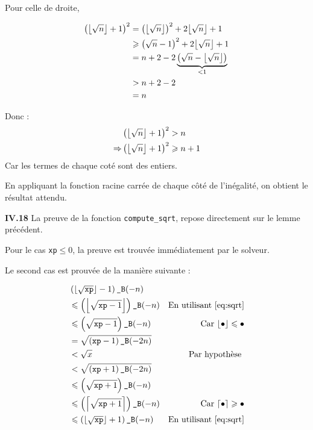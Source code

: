 \documentclass[9pt,a4paper,twocolumn]{article}
\theoremstyle{definition}
\DeclarePairedDelimiter\ceil{\lceil}{\rceil}
\DeclarePairedDelimiter\floor{\lfloor}{\rfloor}
\newcommand{\B}{\texttt{\_B}}
\renewcommand{\leq}{\leqslant}
\renewcommand{\geq}{\geqslant}
\newenvironment{code}[1][ocaml]{%
\newgeometry{textwidth = 0.8\textwidth}
\VerbatimEnvironment\begin{verbatim}%
}{%
\end{verbatim}
\restoregeometry
}
\begin{document}
Pour celle de droite,

\begin{align*}
   \left(\floor*{\sqrt{n}}+1 \right)^2
   &=\left(\floor*{\sqrt{n}}\right)^2 + 2\floor*{\sqrt{n}} +1
\\   &\geq \left(\sqrt{n} -1 \right)^2 + 2\floor*{\sqrt{n}} +1
\\   &= n + 2 -2
      \underbrace{\left(\sqrt{ n }- \floor*{\sqrt{ n }}\right)}_{< 1}
\\   &> n + 2 -2
\\   &= n
\end{align*}

Donc :
\begin{align*}
   &\left(\floor*{\sqrt{n}}+1 \right)^2 > n
\\   \Rightarrow
   &\left(\floor*{\sqrt{n}}+1 \right)^2 \geq n+1
\end{align*}
Car les termes de chaque coté sont des entiers.

En appliquant la fonction racine carrée de chaque côté de l'inégalité,
on obtient le résultat attendu.

\textbf{IV.18}
La preuve de la fonction \texttt{compute\_sqrt}, repose directement sur le lemme
précédent.

Pour le cas \texttt{xp}$\leq 0$, la preuve est trouvée immédiatement par le
solveur.

Le second cas est prouvée de la manière suivante :

\begin{align*}
     &\left( \floor*{\sqrt{ \texttt{xp} }}-1 \right)\B(-n)
\\ &\leq \left( \floor*{\sqrt{ \texttt{xp}-1 }} \right)\B(-n)
  & \text{En utilisant \ref{eq:sqrt}}
\\ &\leq \left( \sqrt{\texttt{xp}-1} \right)\B(-n)
  & \text{Car }\floor{\bullet} \leq \bullet
\\ &=  \sqrt{\left(\texttt{xp}-1 \right)\B(-2n)}
\\ &< \sqrt{ x }
   & \text{Par hypothèse }
\\ &< \sqrt{\left(\texttt{xp}+1 \right)\B(-2n)}
\\ &\leq \left( \sqrt{\texttt{xp}+1} \right)\B(-n)
\\ &\leq \left( \ceil*{\sqrt{ \texttt{xp}+1 }} \right)\B(-n)
   & \text{Car }\ceil*{\bullet} \geq \bullet
\\ &\leq \left( \floor*{\sqrt{ \texttt{xp} }}+1 \right)\B(-n)
& \text{En utilisant \ref{eq:sqrt}}
\end{align*}
\end{document}
